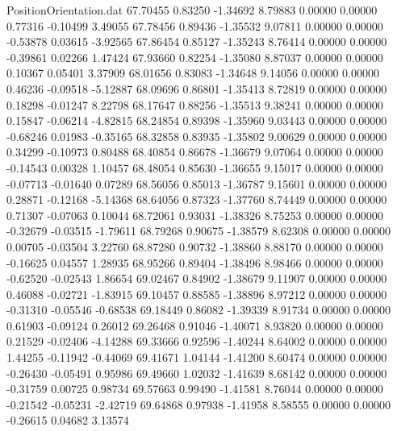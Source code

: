 \begin{filecontents}{PositionOrientation.dat}
  67.70455    0.83250   -1.34692     8.79883    0.00000    0.00000    0.77316   -0.10499    3.49055
  67.78456    0.89436   -1.35532     9.07811    0.00000    0.00000   -0.53878    0.03615   -3.92565
  67.86454    0.85127   -1.35243     8.76414    0.00000    0.00000   -0.39861    0.02266    1.47424
  67.93660    0.82254   -1.35080     8.87037    0.00000    0.00000    0.10367    0.05401    3.37909
  68.01656    0.83083   -1.34648     9.14056    0.00000    0.00000    0.46236   -0.09518   -5.12887
  68.09696    0.86801   -1.35413     8.72819    0.00000    0.00000    0.18298   -0.01247    8.22798
  68.17647    0.88256   -1.35513     9.38241    0.00000    0.00000    0.15847   -0.06214   -4.82815
  68.24854    0.89398   -1.35960     9.03443    0.00000    0.00000   -0.68246    0.01983   -0.35165
  68.32858    0.83935   -1.35802     9.00629    0.00000    0.00000    0.34299   -0.10973    0.80488
  68.40854    0.86678   -1.36679     9.07064    0.00000    0.00000   -0.14543    0.00328    1.10457
  68.48054    0.85630   -1.36655     9.15017    0.00000    0.00000   -0.07713   -0.01640    0.07289
  68.56056    0.85013   -1.36787     9.15601    0.00000    0.00000    0.28871   -0.12168   -5.14368
  68.64056    0.87323   -1.37760     8.74449    0.00000    0.00000    0.71307   -0.07063    0.10044
  68.72061    0.93031   -1.38326     8.75253    0.00000    0.00000   -0.32679   -0.03515   -1.79611
  68.79268    0.90675   -1.38579     8.62308    0.00000    0.00000    0.00705   -0.03504    3.22760
  68.87280    0.90732   -1.38860     8.88170    0.00000    0.00000   -0.16625    0.04557    1.28935
  68.95266    0.89404   -1.38496     8.98466    0.00000    0.00000   -0.62520   -0.02543    1.86654
  69.02467    0.84902   -1.38679     9.11907    0.00000    0.00000    0.46088   -0.02721   -1.83915
  69.10457    0.88585   -1.38896     8.97212    0.00000    0.00000   -0.31310   -0.05546   -0.68538
  69.18449    0.86082   -1.39339     8.91734    0.00000    0.00000    0.61903   -0.09124    0.26012
  69.26468    0.91046   -1.40071     8.93820    0.00000    0.00000    0.21529   -0.02406   -4.14288
  69.33666    0.92596   -1.40244     8.64002    0.00000    0.00000    1.44255   -0.11942   -0.44069
  69.41671    1.04144   -1.41200     8.60474    0.00000    0.00000   -0.26430   -0.05491    0.95986
  69.49660    1.02032   -1.41639     8.68142    0.00000    0.00000   -0.31759    0.00725    0.98734
  69.57663    0.99490   -1.41581     8.76044    0.00000    0.00000   -0.21542   -0.05231   -2.42719
  69.64868    0.97938   -1.41958     8.58555    0.00000    0.00000   -0.26615    0.04682    3.13574

\end{filecontents}
